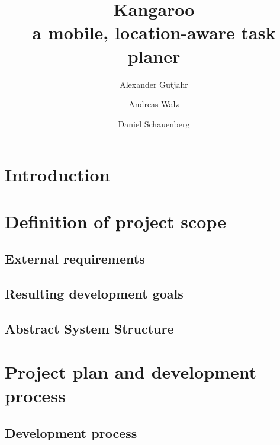 \documentclass[11pt,a4paper]{scrreprt}
\begin{document}
\title{Kangaroo \\ a mobile, location-aware task planer}
\author{Alexander Gutjahr \and Andreas Walz \and
        Daniel Schauenberg}

\maketitle

\tableofcontents

\chapter{Introduction} %
\label{chp:introduction}


\chapter{Definition of project scope} %
	\section{External requirements} %
	\label{chp:requirements}
	
	
	\section{Resulting development goals} %
	\label{chp:dev_goals}
	
	
	\section{Abstract System Structure} %
	\label{chp:structure}
	
	
\chapter{Project plan and development process} %
\label{chp:project_plan}


	\section{Development process} %
	\label{chp:dev process}
	
	
\end{document}
